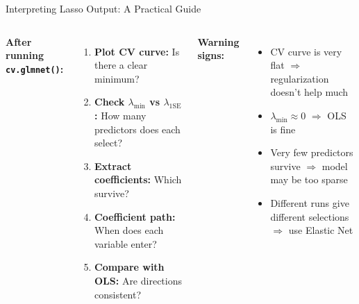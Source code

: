 \documentclass[aspectratio=169, 11pt]{beamer}
\begin{document}
\begin{frame}{Interpreting Lasso Output: A Practical Guide}
\begin{columns}
\textbf{After running \texttt{cv.glmnet()}:}

\begin{enumerate}
  \item \textbf{Plot CV curve:} Is there a clear minimum?
  \item \textbf{Check $\lambda_{\min}$ vs $\lambda_{\text{1SE}}$:} How many predictors does each select?
  \item \textbf{Extract coefficients:} Which survive?
  \item \textbf{Coefficient path:} When does each variable enter?
  \item \textbf{Compare with OLS:} Are directions consistent?
\end{enumerate}

\textbf{Warning signs:}

\begin{itemize}
  \item CV curve is very flat $\Rightarrow$ regularization doesn't help much
  \item $\lambda_{\min} \approx 0$ $\Rightarrow$ OLS is fine
  \item Very few predictors survive $\Rightarrow$ model may be too sparse
  \item Different runs give different selections $\Rightarrow$ use Elastic Net
\end{itemize}
\end{columns}
\end{frame}
\end{document}
